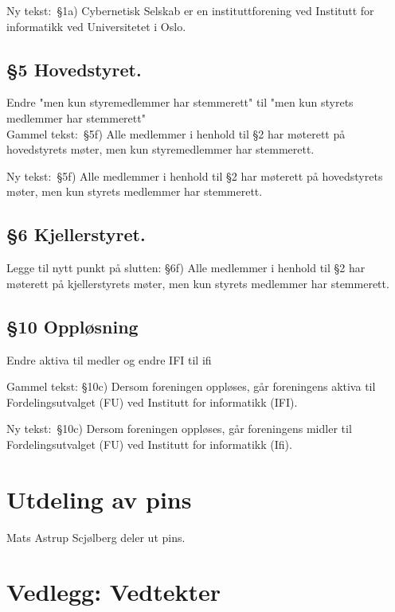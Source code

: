 \documentclass[16pt,norsk,a4paper]{article}
\begin{document}
Ny tekst:\
§1a) Cybernetisk Selskab er en instituttforening ved Institutt for informatikk ved Universitetet i Oslo.

\subsection{§5 Hovedstyret.}
Endre "men kun styremedlemmer har stemmerett" til "men kun styrets medlemmer har stemmerett"\\

Gammel tekst:\
§5f) Alle medlemmer i henhold til §2 har møterett på hovedstyrets møter, men kun styremedlemmer
har stemmerett.

Ny tekst:\
§5f) Alle medlemmer i henhold til §2 har møterett på hovedstyrets møter, men kun styrets medlemmer
har stemmerett.

\subsection{§6 Kjellerstyret.}
Legge til nytt punkt på slutten:
§6f) Alle medlemmer i henhold til §2 har møterett på kjellerstyrets møter, men kun styrets medlemmer har stemmerett.

\subsection{§10 Oppløsning}
Endre aktiva til medler og endre IFI til ifi

Gammel tekst:
§10c) Dersom foreningen oppløses, går foreningens aktiva til Fordelingsutvalget (FU) ved Institutt for
informatikk (IFI).

Ny tekst:\
§10c) Dersom foreningen oppløses, går foreningens midler til Fordelingsutvalget (FU) ved Institutt for
informatikk (Ifi).


\section{Utdeling av pins}
Mats Astrup Scjølberg deler ut pins.\\

\newpage

\section*{Vedlegg: Vedtekter}


\end{document}
